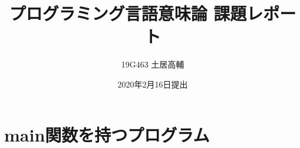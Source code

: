 \documentclass[titlepage]{ujarticle}
\title{プログラミング言語意味論 課題レポート}
\author{19G463 土居高輔}
\date{2020年2月16日提出}
\begin{document}
\maketitle

\section{main関数を持つプログラム}
\end{document}
